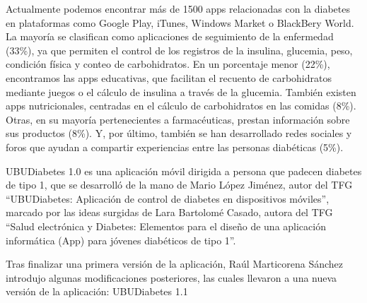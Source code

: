 Actualmente podemos encontrar más de 1500 apps relacionadas con la diabetes en plataformas como Google Play, iTunes, Windows Market o BlackBery World. La mayoría se clasifican como aplicaciones de seguimiento de la enfermedad (33\%), ya que permiten el control de los registros de la insulina, glucemia, peso, condición física y conteo de carbohidratos. En un porcentaje menor (22\%), encontramos las apps educativas, que facilitan el recuento de carbohidratos mediante juegos o el cálculo de insulina a través de la glucemia. También existen apps nutricionales, centradas en el cálculo de carbohidratos en las comidas (8\%). Otras, en su mayoría pertenecientes a farmacéuticas, prestan información sobre sus productos (8\%). Y, por último, también se han desarrollado redes sociales y foros que ayudan a compartir experiencias entre las personas diabéticas (5\%).

UBUDiabetes 1.0 es una aplicación móvil dirigida a persona que padecen diabetes de tipo 1, que se desarrolló de la mano de Mario López Jiménez, autor del TFG ``UBUDiabetes: Aplicación de control de diabetes en dispositivos móviles'', marcado por las ideas surgidas de Lara Bartolomé Casado, autora del TFG ``Salud electrónica y Diabetes: Elementos para el diseño de una aplicación informática (App) para jóvenes diabéticos de tipo 1''.

Tras finalizar una primera versión de la aplicación, Raúl Marticorena Sánchez introdujo algunas modificaciones posteriores, las cuales llevaron a una nueva versión de la aplicación: UBUDiabetes 1.1

